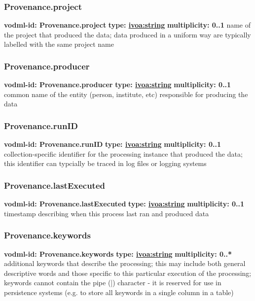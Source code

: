     \subsubsection{Provenance.project}
      \textbf{vodml-id: Provenance.project} \newline
      \textbf{type: \hyperref[sect:ivoa]{ivoa:string}} \newline
      \textbf{multiplicity: 0..1} \newline
      name of the project that produced the data; data produced in a uniform way are typically labelled with the same project name

    \subsubsection{Provenance.producer}
      \textbf{vodml-id: Provenance.producer} \newline
      \textbf{type: \hyperref[sect:ivoa]{ivoa:string}} \newline
      \textbf{multiplicity: 0..1} \newline
      common name of the entity (person, institute, etc) responsible for producing the data

    \subsubsection{Provenance.runID}
      \textbf{vodml-id: Provenance.runID} \newline
      \textbf{type: \hyperref[sect:ivoa]{ivoa:string}} \newline
      \textbf{multiplicity: 0..1} \newline
      collection-specific identifier for the processing instance that produced the data; this identifier can typcially be traced in log files or logging systems

    \subsubsection{Provenance.lastExecuted}
      \textbf{vodml-id: Provenance.lastExecuted} \newline
      \textbf{type: \hyperref[sect:ivoa]{ivoa:string}} \newline
      \textbf{multiplicity: 0..1} \newline
      timestamp describing when this process last ran and produced data

    \subsubsection{Provenance.keywords}
      \textbf{vodml-id: Provenance.keywords} \newline
      \textbf{type: \hyperref[sect:ivoa]{ivoa:string}} \newline
      \textbf{multiplicity: 0..*} \newline
      additional keywords that describe the processing; this may include both general descriptive words and those specific to this particular execution of the processing; keywords cannot contain the pipe (|) character - it is reserved for use in persistence systems (e.g. to store all keywords in a single column in a table)

